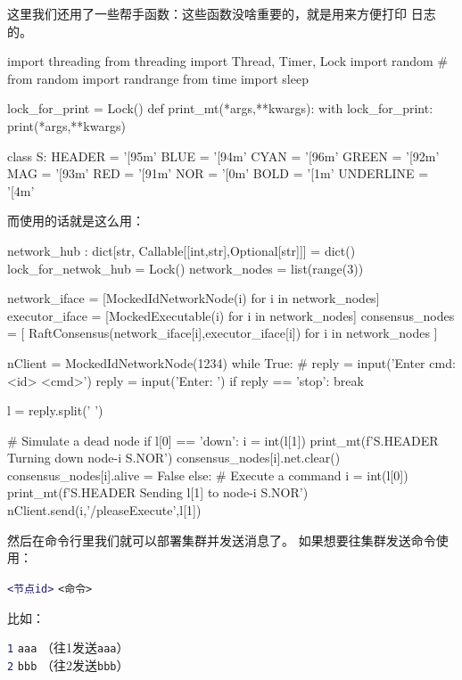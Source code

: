 \documentclass[dvipsnames]{ctexart}
\newcommand{\mycola}{MidnightBlue}
\newcommand{\mycolb}{Mahogany}
\newcommand{\cola}[1]{\textcolor{\mycola}{#1}}
\newcommand{\colb}[1]{\textcolor{\mycolb}{#1}}
\begin{document}
\begin{tcolorbox}
   这里我们还用了一些帮手函数：这些函数没啥重要的，就是用来方便打印
  日志的。
  \begin{simplepy}
import threading
from threading import Thread, Timer, Lock
import random
# from random import randrange
from time import sleep

lock_for_print = Lock()
def print_mt(*args,**kwargs):
    with lock_for_print:
        print(*args,**kwargs)

class S:
    HEADER = '[95m'
    BLUE = '[94m'
    CYAN = '[96m'
    GREEN = '[92m'
    MAG = '[93m'
    RED = '[91m'
    NOR = '[0m'
    BOLD = '[1m'
    UNDERLINE = '[4m'
  \end{simplepy}
\end{tcolorbox}
而使用的话就是这么用：
\begin{simplepy}
network_hub : dict[str, Callable[[int,str],Optional[str]]] = dict()
lock_for_netwok_hub = Lock()
network_nodes = list(range(3))

network_iface = [MockedIdNetworkNode(i) for i in network_nodes]
executor_iface = [MockedExecutable(i) for i in network_nodes]
consensus_nodes = [
    RaftConsensus(network_iface[i],executor_iface[i]) for i in network_nodes
]

nClient = MockedIdNetworkNode(1234)
while True:
    # reply = input('Enter cmd: <id> <cmd>')
    reply = input('Enter: ')
    if reply == 'stop': break

    l = reply.split(' ')

    # Simulate a dead node
    if l[0] == 'down':
        i = int(l[1])
        print_mt(f'{S.HEADER} Turning down node-{i} {S.NOR}')
        consensus_nodes[i].net.clear()
        consensus_nodes[i].alive = False
    else:
        # Execute a command
        i = int(l[0])
        print_mt(f'{S.HEADER} Sending {l[1]} to node-{i} {S.NOR}')
        nClient.send(i,'/pleaseExecute',l[1])
  
\end{simplepy}

然后在命令行里我们就可以部署集群并发送消息了。 如果想要往集群发送命令使用：
\begin{center}
  \cola{\texttt{<节点id>}} \colb{\texttt{<命令>}}
\end{center}
比如：
\begin{center}
  \cola{\texttt{1}} \colb{\texttt{aaa}} （往1发送\texttt{aaa}） \\
  \cola{\texttt{2}} \colb{\texttt{bbb}} （往2发送\texttt{bbb}）\\
\end{center}
\end{document}
